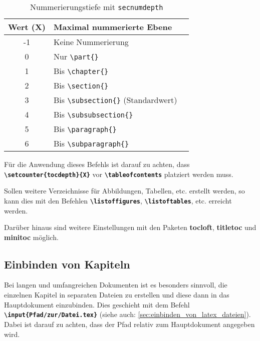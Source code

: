 \begin{table}[H]
  \centering
  \begin{tabular}{cll}
    \toprule
    \textbf{Wert (X)} & \textbf{Maximal nummerierte Ebene}                        \\
    \midrule
    -1                & Keine Nummerierung                                        \\
    0                 & Nur \texttt{\textbackslash part\{\}}                      \\
    1                 & Bis \texttt{\textbackslash chapter\{\}}                   \\
    2                 & Bis \texttt{\textbackslash section\{\}}                   \\
    3                 & Bis \texttt{\textbackslash subsection\{\}} (Standardwert) \\
    4                 & Bis \texttt{\textbackslash subsubsection\{\}}             \\
    5                 & Bis \texttt{\textbackslash paragraph\{\}}                 \\
    6                 & Bis \texttt{\textbackslash subparagraph\{\}}              \\
    \bottomrule
  \end{tabular}
  \caption{Nummerierungstiefe mit \texttt{secnumdepth}}
  \label{tab:secnumdepth}
\end{table}

Für die Anwendung dieses Befehls ist darauf zu achten, dass \textbf{\texttt{\textbackslash setcounter\{tocdepth\}\{X\}}} vor \textbf{\texttt{\textbackslash tableofcontents}} platziert werden muss.

Sollen weitere Verzeichnisse für Abbildungen, Tabellen, etc. erstellt werden, so kann dies mit den Befehlen \textbf{\texttt{\textbackslash listoffigures}}, \textbf{\texttt{\textbackslash listoftables}}, etc. erreicht werden.

Darüber hinaus sind weitere Einstellungen mit den Paketen \textbf{tocloft}, \textbf{titletoc} und \textbf{minitoc} möglich.

\subsection{Einbinden von Kapiteln}
Bei langen und umfangreichen Dokumenten ist es besonders sinnvoll, die einzelnen Kapitel in separaten Dateien zu erstellen und diese dann in das Hauptdokument einzubinden. Dies geschieht mit dem Befehl \textbf{\texttt{\textbackslash input\{Pfad/zur/Datei.tex\}}} (siehe auch: \ref{sec:einbinden_von_latex_dateien}). Dabei ist darauf zu achten, dass der Pfad relativ zum Hauptdokument angegeben wird.

